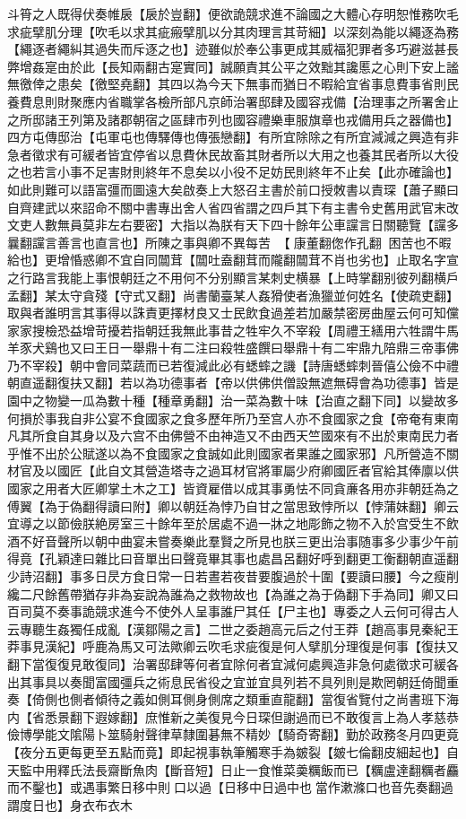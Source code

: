 斗筲之人既得伏奏帷扆【扆於豈翻】便欲詭競求進不論國之大體心存明恕惟務吹毛求疵擘肌分理【吹毛以求其疵瘢擘肌以分其肉理言其苛細】以深刻為能以繩逐為務【繩逐者繩糾其過失而斥逐之也】迹雖似於奉公事更成其威福犯罪者多巧避滋甚長弊增姦寔由於此【長知兩翻古寔實同】誠願責其公平之效黜其讒慝之心則下安上謐無徼倖之患矣【徼堅堯翻】其四以為今天下無事而猶日不暇給宜省事息費事省則民養費息則財聚應内省職掌各檢所部凡京師治署邸肆及國容戎備【治理事之所署舍止之所邸諸王列第及諸郡朝宿之區肆市列也國容禮樂車服旗章也戎備用兵之器備也】四方屯傳邸治【屯軍屯也傳驛傳也傳張戀翻】有所宜除除之有所宜減減之興造有非急者徵求有可緩者皆宜停省以息費休民故畜其財者所以大用之也養其民者所以大役之也若言小事不足害財則終年不息矣以小役不足妨民則終年不止矣【此亦確論也】如此則難可以語富彊而圖遠大矣啟奏上大怒召主書於前口授敇書以責琛【蕭子顯曰自齊建武以來詔命不關中書專出舍人省四省謂之四戶其下有主書令史舊用武官末改文吏人數無員莫非左右要密】大指以為朕有天下四十餘年公車讜言日關聽覽【讜多曩翻讜言善言也直言也】所陳之事與卿不異每苦【康董翻偬作孔翻困苦也不暇給也】更增惛惑卿不宜自同闒茸【闒吐盍翻茸而隴翻闒茸不肖也劣也】止取名字宣之行路言我能上事恨朝廷之不用何不分别顯言某刺史横暴【上時掌翻别彼列翻横戶孟翻】某太守貪殘【守式又翻】尚書蘭臺某人姦猾使者漁獵並何姓名【使疏吏翻】取與者誰明言其事得以誅責更擇材良又士民飲食過差若加嚴禁密房曲屋云何可知儻家家搜檢恐益增苛擾若指朝廷我無此事昔之牲牢久不宰殺【周禮王繕用六牲謂牛馬羊豕犬鷄也又曰王日一舉鼎十有二注曰殺牲盛饌曰舉鼎十有二牢鼎九陪鼎三帝事佛乃不宰殺】朝中會同菜蔬而已若復減此必有蟋蟀之譏【詩唐蟋蟀刺晉僖公儉不中禮朝直遥翻復扶又翻】若以為功德事者【帝以供佛供僧設無遮無碍會為功德事】皆是園中之物變一瓜為數十種【種章勇翻】治一菜為數十味【治直之翻下同】以變故多何損於事我自非公宴不食國家之食多歷年所乃至宫人亦不食國家之食【帝奄有東南凡其所食自其身以及六宫不由佛營不由神造又不由西天竺國來有不出於東南民力者乎惟不出於公賦遂以為不食國家之食誠如此則國家者果誰之國家邪】凡所營造不關材官及以國匠【此自文其營造塔寺之過耳材官將軍屬少府卿國匠者官給其俸廪以供國家之用者大匠卿掌土木之工】皆資雇借以成其事勇怯不同貪亷各用亦非朝廷為之傅翼【為于偽翻得讀曰附】卿以朝廷為悖乃自甘之當思致悖所以【悖蒲妹翻】卿云宜導之以節儉朕絶房室三十餘年至於居處不過一牀之地彫飾之物不入於宫受生不飲酒不好音聲所以朝中曲宴未嘗奏樂此羣賢之所見也朕三更出治事随事多少事少午前得竟【孔穎達曰雜比曰音單出曰聲竟畢其事也處昌呂翻好呼到翻更工衡翻朝直遥翻少詩沼翻】事多日昃方食日常一日若晝若夜昔要腹過於十圍【要讀曰腰】今之瘦削纔二尺餘舊帶猶存非為妄說為誰為之救物故也【為誰之為于偽翻下手為同】卿又曰百司莫不奏事詭競求進今不使外人呈事誰尸其任【尸主也】專委之人云何可得古人云專聽生姦獨任成亂【漢鄒陽之言】二世之委趙高元后之付王莽【趙高事見秦紀王莽事見漢紀】呼鹿為馬又可法歟卿云吹毛求疵復是何人擘肌分理復是何事【復扶又翻下當復復見敢復同】治署邸肆等何者宜除何者宜減何處興造非急何處徵求可緩各出其事具以奏聞富國彊兵之術息民省役之宜並宜具列若不具列則是欺罔朝廷倚聞重奏【倚側也側者傾待之義如側耳側身側席之類重直龍翻】當復省覽付之尚書班下海内【省悉景翻下遐嫁翻】庶惟新之美復見今日琛但謝過而已不敢復言上為人孝慈恭儉博學能文隂陽卜筮騎射聲律草隸圍碁無不精妙【騎奇寄翻】勤於政務冬月四更竟【夜分五更每更至五點而竟】即起視事執筆觸寒手為皴裂【皴七倫翻皮細起也】自天監中用釋氏法長齋斷魚肉【斷音短】日止一食惟菜羮糲飯而已【糲盧達翻糲者麤而不鑿也】或遇事繁日移中則口以過【日移中日過中也當作漱滌口也音先奏翻過謂度日也】身衣布衣木